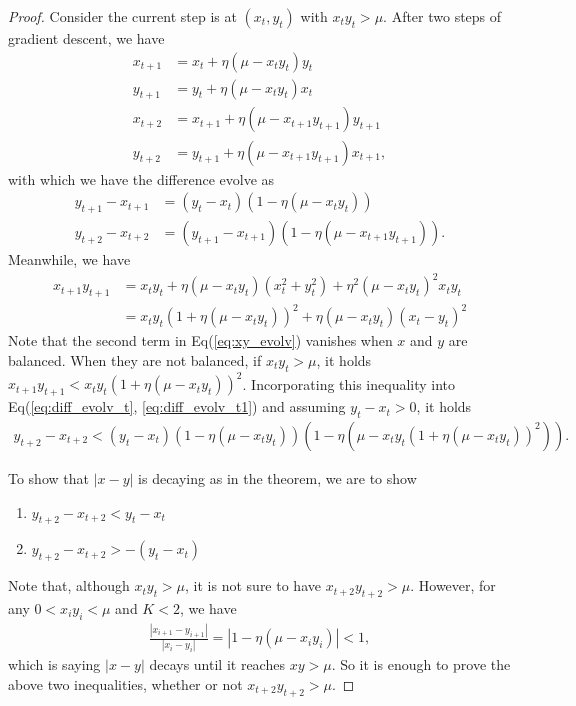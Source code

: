 \documentclass{article}
\theoremstyle{plain}
\theoremstyle{remark}
\begin{document}
\begin{proof}
Consider the current step is at $(x_t,y_t)$ with $x_t y_t>\mu$. After two steps of gradient descent, we have
\begin{align}
    x_{t+1} &= x_t + \eta(\mu-x_t y_t)y_t \label{eq:ite_xtp1}\\
    y_{t+1} &= y_t + \eta(\mu-x_t y_t)x_t
    \label{eq:ite_ytp1}\\
    x_{t+2} &= x_{t+1} + \eta(\mu-x_{t+1} y_{t+1})y_{t+1}\\
    y_{t+2} &= y_{t+1} + \eta(\mu-x_{t+1} y_{t+1})x_{t+1},
\end{align}
with which we have the difference evolve as
\begin{align}
    y_{t+1}-x_{t+1}
    &=
    \left(y_t-x_t\right)
    \left(1-\eta\left(\mu-x_t y_t\right)\right)
    \label{eq:diff_evolv_t}
    \\
    y_{t+2}-x_{t+2}
    &=
    \left(y_{t+1}-x_{t+1}\right)
    \left(1-\eta\left(\mu-x_{t+1} y_{t+1}\right)\right)
    \label{eq:diff_evolv_t1}.
\end{align}
Meanwhile, we have
\begin{align}
    x_{t+1}y_{t+1} &=x_t y_t+\eta\left(\mu-x_t y_t\right)\left(x_t^2+y_t^2\right)+\eta^2\left(\mu-x_t y_t\right)^2 x_t y_t
    \nonumber
    \\
    &=
    x_t y_t\left(1+\eta\left(\mu-x_t y_t\right)\right)^2 + \eta\left(\mu-x_t y_t\right)\left(x_t-y_t\right)^2
    \label{eq:xy_evolv}
\end{align}
Note that the second term in Eq(\ref{eq:xy_evolv}) vanishes when $x$ and $y$ are balanced. When they are not balanced, if $x_t y_t>\mu$, it holds $x_{t+1}y_{t+1}<x_t y_t\left(1+\eta\left(\mu-x_t y_t\right)\right)^2$. Incorporating this inequality into Eq(\ref{eq:diff_evolv_t}, \ref{eq:diff_evolv_t1}) and assuming $y_t-x_t>0$, it holds
\begin{align}
    y_{t+2}-x_{t+2}<
    \left(y_t - x_t\right)
    \left(1-\eta\left(\mu-x_t y_t\right)\right)
    \left(1-\eta\left(\mu-x_t y_t\left(1+\eta\left(\mu-x_t y_t\right)\right)^2\right)\right).
    \label{eq:diff_evolv_t2}
\end{align}

To show that $|x-y|$ is decaying as in the theorem, we are to show
\begin{enumerate}
    \item $y_{t+2}-x_{t+2}<y_t-x_t$
    \item $y_{t+2}-x_{t+2}>-(y_t-x_t)$
\end{enumerate}
Note that, although $x_t y_t>\mu$, it is not sure to have $x_{t+2} y_{t+2}>\mu$. However, for any $0<x_i y_i<\mu$ and $K<2$, we have
\begin{align}
    \frac{|x_{i+1}-y_{i+1}|}{|x_i-y_i|}=\left| 1-\eta\left(\mu-x_i y_i\right)\right| <1, \label{eq:temp4}
\end{align}
which is saying $|x-y|$ decays until it reaches $xy>\mu$. So it is enough to prove the above two inequalities, whether or not $x_{t+2} y_{t+2}>\mu$.


\end{proof}
\end{document}
